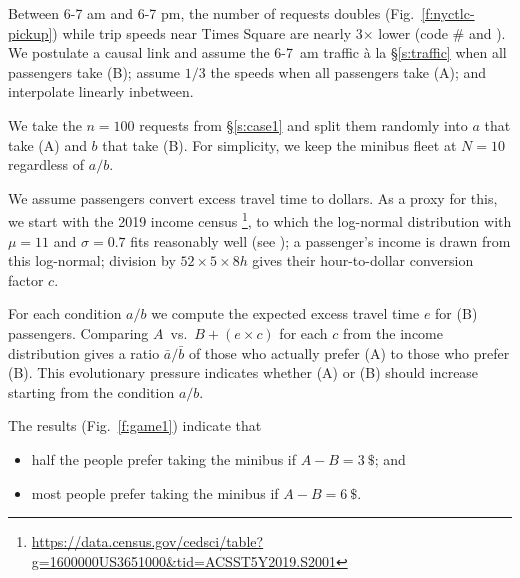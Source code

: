 \documentclass[12pt,notitlepage]{article}
\begin{document}
%

Between 6-7 am and 6-7 pm,
the number of requests doubles (Fig.~\ref{f:nyctlc-pickup})
while trip speeds near Times Square are nearly 3$\times$ lower
(code \#\codetriptime\xspace and ).
%
%
We postulate a causal link and
assume the 6-7~am traffic \`a la \S\ref{s:traffic} 
when all passengers take (B);
assume $1/3$ the speeds 
when all passengers take (A);
and
interpolate linearly inbetween.

%

We take the $n = 100$ requests from \S\ref{s:case1}
and split them randomly into $a$ that take (A) and $b$ that take (B).
%
%
For simplicity,
we keep the minibus fleet at $N = 10$ regardless of $a/b$.

%

We assume
passengers convert excess travel time to dollars.
%
As a proxy for this, we start with the 2019 income census%
\footnote{\href{https://data.census.gov/cedsci/table?g=1600000US3651000&tid=ACSST5Y2019.S2001&hidePreview=true&moe=false}{https://data.census.gov/cedsci/table?g=1600000US3651000\&tid=ACSST5Y2019.S2001}},
to which
the log-normal distribution with $\mu = 11$ and $\sigma = 0.7$ fits reasonably well
(see );
%
a passenger's income is drawn from this log-normal;
%
division by $52 \times 5 \times 8 \si{h}$ gives their hour-to-dollar conversion factor $c$.
%

%

For each condition $a / b$
we compute the expected excess travel time $e$ 
for (B) passengers.
%
%
%
Comparing
$A$~vs.~$B + (e \times c)$
for each $c$ from the income distribution
gives a ratio $\bar{a} / \bar{b}$
of those who actually prefer (A) to those who prefer (B).
%
%
This evolutionary pressure
indicates
whether (A) or (B) should increase 
starting from the condition $a / b$.

%

The results (Fig.~\ref{f:game1})
indicate that 
\begin{itemize}
\item 
	half the people prefer taking the minibus if $A - B = \SI{3}{\$}$; and
\item
	most people prefer taking the minibus if $A - B = \SI{6}{\$}$.
\end{itemize}
\end{document}
